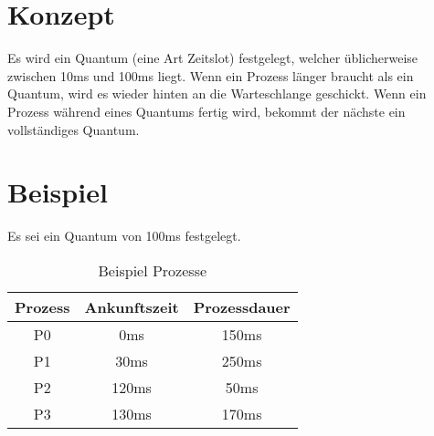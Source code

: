 \documentclass{article}
\begin{document}
\maketitle

\section{Konzept}

Es wird ein Quantum (eine Art Zeitslot) festgelegt, welcher üblicherweise zwischen 10ms und 100ms liegt. Wenn ein Prozess länger braucht als ein Quantum, wird es wieder hinten an die Warteschlange geschickt. Wenn ein Prozess während eines Quantums fertig wird, bekommt der nächste ein vollständiges Quantum.

\section{Beispiel}

Es sei ein Quantum von 100ms festgelegt.

\begin{table}[!h]
    \centering
    \begin{tabular}{c|c|c}
        \textbf{Prozess} & \textbf{Ankunftszeit} & \textbf{Prozessdauer} \\
        \hline{}
        P0               & 0ms                   & 150ms                 \\
        P1               & 30ms                  & 250ms                 \\
        P2               & 120ms                 & 50ms                  \\
        P3               & 130ms                 & 170ms
    \end{tabular}
    \caption{Beispiel Prozesse}
\end{table}
\end{document}
